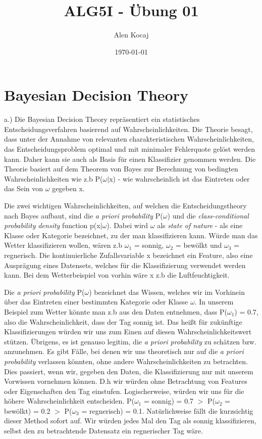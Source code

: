 \documentclass[10pt, a4paper]{scrartcl}
\title{ALG5I - Übung 01}
\author{Alen Kocaj}
\date{\today}
\begin{document}
\maketitle

\section{Bayesian Decision Theory}
a.) Die Bayesian Decision Theory repräsentiert ein statistisches Entscheidungsverfahren basierend auf Wahrscheinlichkeiten.
Die Theorie besagt, dass unter der Annahme von relevanten charakteristischen Wahrscheinlichkeiten, das Entscheidungsproblem optimal
und mit minimaler Fehlerquote gelöst werden kann. Daher kann sie auch als Basis für einen Klassifizier genommen werden. Die Theorie basiert auf dem
Theorem von Bayes zur Berechnung von bedingten Wahrscheinlichkeiten wie z.b P($\omega$$\mid$x) - wie wahrscheinlich ist das Eintreten oder das Sein von $\omega$ gegeben x. 

\bigskip\noindent
Die zwei wichtigen Wahrscheinlichkeiten, auf welchen die Entscheidungstheory nach Bayes aufbaut,
sind die \textit{a priori probability} P($\omega$) und die \textit{class-conditional probability density} function p(x$\mid$$\omega$).
Dabei wird $\omega$ als \textit{state of nature} - als eine Klasse oder Kategorie bezeichnet, zu der man klassifizieren kann. Würde man das Wetter klassifizieren wollen, 
wären z.b $\omega_1$ = sonnig, $\omega_2$ = bewölkt und $\omega_3$ = regnerisch. Die kontinuierliche Zufallsvariable x bezeichnet ein Feature, also eine Ausprägung eines Datensets, welches für die Klassifizierung verwendet werden kann. Bei dem Wetterbeispiel von vorhin wäre x z.b die Luftfeuchtigkeit.

\bigskip\noindent
Die \textit{a priori probability} P($\omega$) bezeichnet das Wissen, welches wir im Vorhinein über das Eintreten einer bestimmten Kategorie oder Klasse $\omega$. In unserem Beispiel zum Wetter könnte man z.b aus den Daten entnehmen,
dass P($\omega_1$) = 0.7, also die Wahrscheinlichkeit, dass der Tag sonnig ist. Das heißt für zukünftige Klassifizierungen würden wir uns zum Einen auf diesen Wahrscheinlichkeitswert stützen. Übrigens, es ist genauso legitim, die \textit{a priori probability} zu schätzen bzw. anzunehmen.
Es gibt Fälle, bei denen wir uns theoretisch nur auf die \textit{a priori probability} verlassen könnten, ohne andere Wahrscheinlichkeiten zu betrachten. Dies passiert, wenn wir, gegeben den Daten, die Klassifizierung nur mit unserem Vorwissen vornehmen können. D.h wir würden
ohne Betrachtung von Features oder Eigenschaften den Tag einstufen. Logischerweise, würden wir uns für die höhere Wahrscheinlichkeit entscheiden. 
P($\omega_1$ = sonnig) = 0.7 $>$ P($\omega_2$ = bewölkt) = 0.2 $>$ P($\omega_3$ = regnerisch) = 0.1. Natürlichweise fällt die kurzsichtig dieser Method sofort auf. 
Wir würden jedes Mal den Tag als sonnig klassifizieren, selbst den zu betrachtende Datensatz ein regnerischer Tag wäre.
\end{document}
